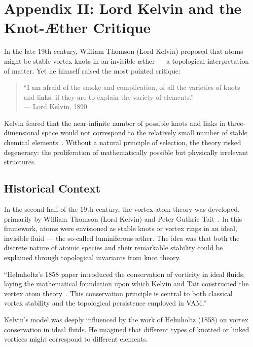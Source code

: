 
\section*{Appendix II: Lord Kelvin and the Knot-Æther Critique}

In the late 19th century, William Thomson (Lord Kelvin) proposed that atoms might be stable vortex knots in an invisible æther — a topological interpretation of matter. Yet he himself raised the most pointed critique:

\begin{quote}
“I am afraid of the smoke and complication, of all the varieties of knots and links, if they are to explain the variety of elements.” \\
— Lord Kelvin, 1890
\end{quote}

Kelvin feared that the near-infinite number of possible knots and links in three-dimensional space would not correspond to the relatively small number of stable chemical elements~\cite{thomson1890knots, tait1877knots}. Without a natural principle of selection, the theory risked degeneracy: the proliferation of mathematically possible but physically irrelevant structures.

\subsection*{Historical Context}

In the second half of the 19th century, the vortex atom theory was developed, primarily by William Thomson (Lord Kelvin) and Peter Guthrie Tait~\cite{thomson1890knots, tait1877knots}. In this framework, atoms were envisioned as stable knots or vortex rings in an ideal, invisible fluid — the so-called luminiferous æther. The idea was that both the discrete nature of atomic species and their remarkable stability could be explained through topological invariants from knot theory.

“Helmholtz’s 1858 paper introduced the conservation of vorticity in ideal fluids, laying the mathematical foundation upon which Kelvin and Tait constructed the vortex atom theory~\cite{helmholtz1858vortices}. This conservation principle is central to both classical vortex stability and the topological persistence employed in VAM.”

Kelvin’s model was deeply influenced by the work of Helmholtz (1858) on vortex conservation in ideal fluids. He imagined that different types of knotted or linked vortices might correspond to different elements.

